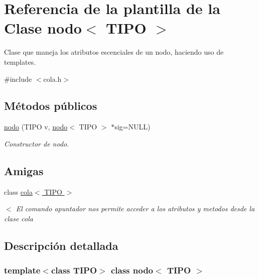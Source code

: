 \hypertarget{classnodo}{}\section{Referencia de la plantilla de la Clase nodo$<$ T\+I\+PO $>$}
\label{classnodo}


Clase que maneja los atributos escenciales de un nodo, haciendo uso de templates.  




{\ttfamily \#include $<$cola.\+h$>$}

\subsection*{Métodos públicos}
\begin{DoxyCompactItemize}
\item 
\hyperlink{classnodo_ad6c42379673cc2de946e77dacace5155}{nodo} (T\+I\+PO v, \hyperlink{classnodo}{nodo}$<$ T\+I\+PO $>$ $\ast$sig=N\+U\+LL)
\begin{DoxyCompactList}\small\item\em Constructor de nodo. \end{DoxyCompactList}\end{DoxyCompactItemize}
\subsection*{Amigas}
\begin{DoxyCompactItemize}
\item 
\mbox{\label{classnodo_ab6f31a6b425c314a481175b5254170ab}} 
class \hyperlink{classnodo_ab6f31a6b425c314a481175b5254170ab}{cola$<$ T\+I\+P\+O $>$}
\begin{DoxyCompactList}\small\item\em $<$ El comando apuntador nos permite acceder a los atributos y metodos desde la clase cola \end{DoxyCompactList}\end{DoxyCompactItemize}


\subsection{Descripción detallada}
\subsubsection*{template$<$class T\+I\+PO$>$\newline
class nodo$<$ T\+I\+P\+O $>$}

